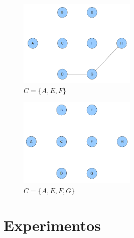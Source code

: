 \documentclass{beamer}[10]
\begin{document}
{\begin{figure}[ht]
\centering
\includegraphics[width=0.5\textwidth]{../doc/img/exemplo1/passo4.png}
\caption{$C=\{A, E, F\}$}
\label{fig:exemplo1-passo4}
\end{figure}


\begin{figure}[ht]
\centering
\includegraphics[width=0.5\textwidth]{../doc/img/exemplo1/passo5.png}
\caption{$C=\{A, E, F, G\}$}
\label{fig:exemplo1-passo5}
\end{figure}
}


\section{Experimentos}
\end{document}
